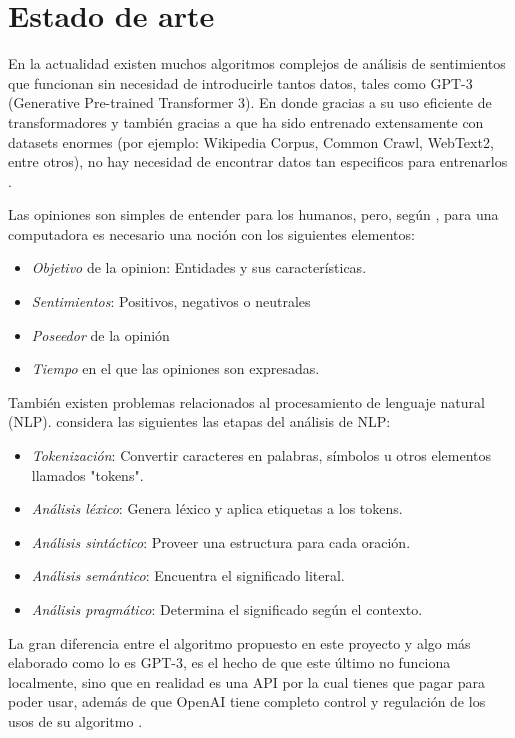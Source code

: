 \documentclass[a4]{sciposter}
\begin{document}
\begin{multicols}{2}
\begin{figure}
\end{figure}

\section{Estado de arte}

En la actualidad existen muchos algoritmos complejos de análisis de sentimientos que funcionan sin necesidad de introducirle tantos datos, tales como GPT-3 (Generative Pre-trained Transformer 3). En donde gracias a su uso eficiente de transformadores y también gracias a que ha sido entrenado extensamente con datasets enormes (por ejemplo: Wikipedia Corpus, Common Crawl, WebText2, entre otros), no hay necesidad de encontrar datos tan especificos para entrenarlos \citep{gpt3}.

Las opiniones son simples de entender para los humanos, pero, según \citet{liu}, para una computadora es necesario una noción con los siguientes elementos:

\begin{itemize}
    \item \textit{Objetivo} de la opinion: Entidades y sus características.
    \item \textit{Sentimientos}: Positivos, negativos o neutrales
    \item \textit{Poseedor} de la opinión
    \item \textit{Tiempo} en el que las opiniones son expresadas.
\end{itemize}

También existen problemas relacionados al procesamiento de lenguaje natural (NLP). \citet{Dale} considera las siguientes las etapas del análisis de NLP:
\begin{itemize}
    \item \textit{Tokenización}: Convertir caracteres en palabras, símbolos u otros elementos llamados "tokens".
    \item \textit{Análisis léxico}: Genera léxico y aplica etiquetas a los tokens.
    \item \textit{Análisis sintáctico}: Proveer una estructura para cada oración.
    \item \textit{Análisis semántico}: Encuentra el significado literal.
    \item \textit{Análisis pragmático}: Determina el significado según el contexto.
\end{itemize}

La gran diferencia entre el algoritmo propuesto en este proyecto y algo más elaborado como lo es GPT-3, es el hecho de que este último no funciona localmente, sino que en realidad es una API por la cual tienes que pagar para poder usar, además de que OpenAI tiene completo control y regulación de los usos de su algoritmo \citep{openai}. 


\end{multicols}
\end{document}
